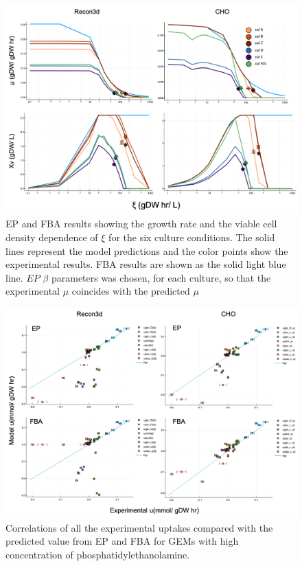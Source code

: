 	\begin{figure}[H]
		\includegraphics[scale = 0.5]{rich_medium_1}
		\caption{EP and FBA results showing the growth rate and the viable cell density dependence of $\xi$ for the six culture conditions. The solid lines represent the model predictions and the color points show the experimental results. FBA results are shown as the solid light blue line. $EP$ $\beta$ parameters was chosen, for each culture, so that the experimental $\mu$ coincides with the predicted $\mu$}
		
	\end{figure}
	
	\begin{figure}[H]
		\includegraphics[scale = 0.5]{rich_medium_2}
		\caption{Correlations of all the experimental uptakes compared with the predicted value from EP and FBA for GEMs with high concentration of phosphatidylethanolamine.}
		
	\end{figure}